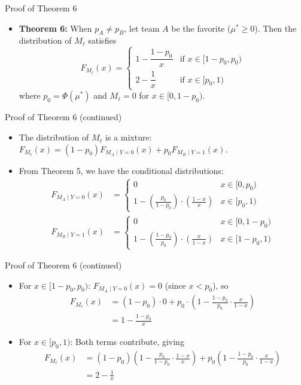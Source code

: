 \documentclass{beamer}
\begin{document}
\begin{frame}{Proof of Theorem 6}
\begin{itemize}
  \item \textbf{Theorem 6:} When $p_A \neq p_B$, let team $A$ be the favorite ($\mu^* \geq 0$). Then the distribution of $M_\ell$ satisfies
  \begin{equation*}
    F_{M_\ell}(x) = \begin{cases}
      1 - \dfrac{1-p_0}{x} & \text{if } x \in [1 - p_0, p_0) \\
      2 - \dfrac{1}{x} & \text{if } x \in [p_0, 1)
    \end{cases} 
  \end{equation*}
  where $p_0 = \Phi(\mu^*)$ and $M_\ell = 0$ for $x \in [0, 1-p_0)$.
\end{itemize}
\end{frame}

\begin{frame}{Proof of Theorem 6 (continued)}
\begin{itemize}
  \item The distribution of $M_\ell$ is a mixture: $F_{M_\ell}(x) = (1-p_0) F_{M_A \mid Y = 0}(x) + p_0 F_{M_B \mid Y = 1}(x)$.
  \item From Theorem 5, we have the conditional distributions:
  \begin{align*}
    F_{M_A \mid Y = 0}(x) &= \begin{cases} 0 & x \in [0, p_0) \\ 1 - \left(\frac{p_0}{1-p_0}\right) \cdot \left(\frac{1 - x}{x}\right) & x \in [p_0, 1) \end{cases} \\
    F_{M_B \mid Y = 1}(x) &= \begin{cases} 0 & x \in [0, 1-p_0) \\ 1 - \left(\frac{1-p_0}{p_0}\right) \cdot \left(\frac{x}{1-x}\right) & x \in [1-p_0, 1) \end{cases}
  \end{align*}
\end{itemize}
\end{frame}

\begin{frame}{Proof of Theorem 6 (continued)}
\begin{itemize}
  \item For $x \in [1-p_0, p_0)$: $F_{M_A \mid Y = 0}(x) = 0$ (since $x < p_0$), so
  \begin{align*}
    F_{M_\ell}(x) &= (1-p_0) \cdot 0 + p_0 \cdot \left(1 - \frac{1-p_0}{p_0} \cdot \frac{x}{1-x}\right) \\
    &= 1 - \frac{1-p_0}{x}
  \end{align*}
  \item For $x \in [p_0, 1)$: Both terms contribute, giving
  \begin{align*}
    F_{M_\ell}(x) &= (1-p_0)\left(1 - \frac{p_0}{1-p_0} \cdot \frac{1-x}{x}\right) + p_0\left(1 - \frac{1-p_0}{p_0} \cdot \frac{x}{1-x}\right) \\
    &= 2 - \frac{1}{x}
  \end{align*}
\end{itemize}
\end{frame}
\end{document}
